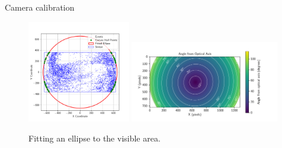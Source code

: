 \documentclass{beamer}
\begin{document}
\begin{frame}{Camera calibration}
   
   \begin{adjustwidth}{-4cm}{-4cm} %
        \begin{figure}
            \centering
            \includegraphics[width=0.40\textwidth]{./fig/pgfplot/build/ellipse_hull.pdf}
            \includegraphics[width=0.58\textwidth]{./fig/pgfplot/build/evk4_viz.pdf}
            \caption{Fitting an ellipse to the visible area.}
            \label{fig:calib2}
        \end{figure}
    \end{adjustwidth}
    
\end{frame}

   
    
\end{document}
